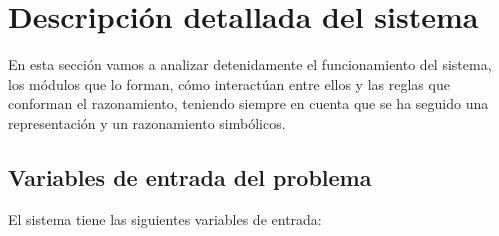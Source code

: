 \documentclass[a4paper, 11pt, titlepage]{article}
\begin{document}
    \section{Descripción detallada del sistema}

    En esta sección vamos a analizar detenidamente el funcionamiento del sistema, los módulos que lo forman, cómo interactúan entre ellos y las reglas que conforman el razonamiento, teniendo siempre en cuenta que se ha seguido una representación y un razonamiento simbólicos.

    \subsection{Variables de entrada del problema}
    \label{ch:varEntrada}

    El sistema tiene las siguientes variables de entrada:
\end{document}
